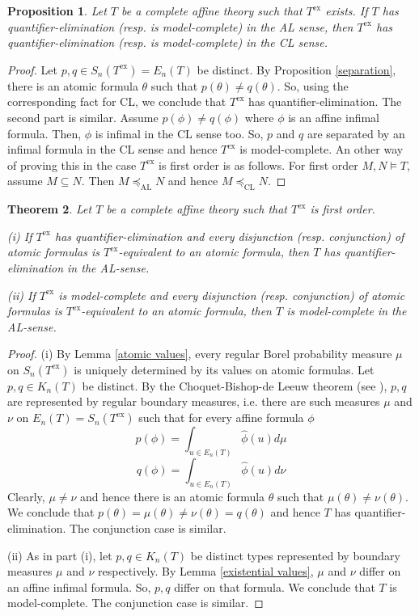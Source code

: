 \documentclass[12pt]{article}
\newtheorem{theorem}{Theorem}[section]
\newtheorem{proposition}[theorem]{Proposition}
\begin{document}
\begin{proposition} \label{main0}
Let $T$ be a complete affine theory such that $T^{\textrm{ex}}$ exists.
If $T$ has quantifier-elimination (resp. is model-complete) in the AL sense, then $T^{\textrm{ex}}$
has quantifier-elimination (resp. is model-complete) in the CL sense.
\end{proposition}
\begin{proof}
Let $p,q\in S_n(T^{\textrm{ex}})=E_n(T)$ be distinct. By Proposition \ref{separation},
there is an atomic formula $\theta$ such that $p(\theta)\neq q(\theta)$.
So, using the corresponding fact for CL, we conclude that $T^{\textrm{ex}}$ has quantifier-elimination.
The second part is similar. Assume $p(\phi)\neq q(\phi)$ where $\phi$ is an affine infimal formula.
Then, $\phi$ is infimal in the CL sense too. So, $p$ and $q$ are separated by an infimal formula in the CL sense
and hence $T^{\textrm{ex}}$ is model-complete.
An other way of proving this in the case $T^{\textrm{ex}}$ is first order is as follows.
For first order $M,N\vDash T$, assume $M\subseteq N$.
Then $M\preccurlyeq_{\mathrm{AL}}N$ and hence $M\preccurlyeq_{\mathrm{CL}}N$.
\end{proof}

\begin{theorem} \label{main}
Let $T$ be a complete affine theory such that $T^{\textrm{ex}}$ is first order.

(i) If $T^{\textrm{ex}}$ has quantifier-elimination and every disjunction (resp. conjunction) of atomic formulas is
$T^{\textrm{ex}}$-equivalent to an atomic formula, then $T$ has quantifier-elimination in the AL-sense.

(ii) If $T^{\textrm{ex}}$ is model-complete and every disjunction (resp. conjunction) of atomic formulas is
$T^{\textrm{ex}}$-equivalent to an atomic formula, then $T$ is model-complete in the AL-sense.
\end{theorem}
\begin{proof}
(i) By Lemma \ref{atomic values}, every regular Borel probability measure $\mu$ on
$S_n(T^{\textrm{ex}})$ is uniquely determined by its values on atomic formulas.
Let $p,q\in K_n(T)$ be distinct. By the Choquet-Bishop-de Leeuw theorem (see \cite{Alfsen}), $p,q$ are represented
by regular boundary measures, i.e. there are such measures $\mu$ and $\nu$ on $E_n(T)=S_n(T^{\textrm{ex}})$
such that for every affine formula $\phi$
$$p(\phi)=\int_{u\in E_n(T)}\hat\phi(u)d\mu$$ $$q(\phi)=\int_{u\in E_n(T)}\hat\phi(u)d\nu$$
Clearly, $\mu\neq\nu$ and hence there is an atomic formula $\theta$ such that $\mu(\theta)\neq\nu(\theta)$.
We conclude that $p(\theta)=\mu(\theta)\neq\nu(\theta)=q(\theta)$ and hence $T$ has quantifier-elimination.
The conjunction case is similar.

(ii) As in part (i), let $p,q\in K_n(T)$ be distinct types represented by boundary measures $\mu$ and $\nu$ respectively.
By Lemma \ref{existential values}, $\mu$ and $\nu$ differ on an affine infimal formula.
So, $p,q$ differ on that formula. We conclude that $T$ is model-complete. The conjunction case is similar.
\end{proof}
\vspace{1mm}
\end{document}
